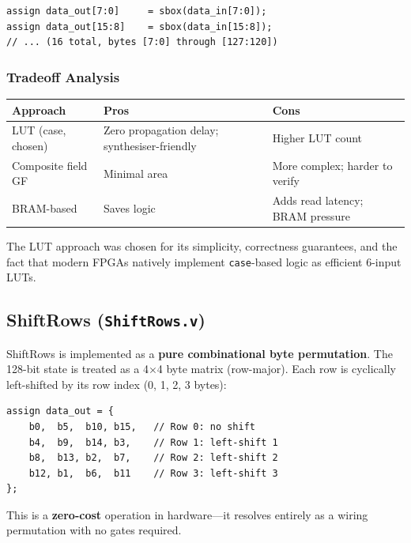 \documentclass[12pt,a4paper]{article}
\begin{document}
\begin{lstlisting}[caption={Parallel byte-wise S-box application}]
assign data_out[7:0]     = sbox(data_in[7:0]);
assign data_out[15:8]    = sbox(data_in[15:8]);
// ... (16 total, bytes [7:0] through [127:120])
\end{lstlisting}

\subsubsection{Tradeoff Analysis}

\begin{table}[H]
\centering
\begin{tabular}{@{}lll@{}}
\toprule
\textbf{Approach} & \textbf{Pros} & \textbf{Cons}\\
\midrule
LUT (case, chosen) & Zero propagation delay; synthesiser-friendly & Higher LUT count\\
Composite field GF & Minimal area & More complex; harder to verify\\
BRAM-based         & Saves logic & Adds read latency; BRAM pressure\\
\bottomrule
\end{tabular}
\end{table}

The LUT approach was chosen for its simplicity, correctness guarantees, and
the fact that modern FPGAs natively implement \texttt{case}-based logic as
efficient 6-input LUTs.

\subsection{ShiftRows (\texttt{ShiftRows.v})}

ShiftRows is implemented as a \textbf{pure combinational byte permutation}.
The 128-bit state is treated as a 4$\times$4 byte matrix (row-major). Each
row is cyclically left-shifted by its row index (0, 1, 2, 3 bytes):

\begin{lstlisting}[caption={ShiftRows byte permutation}]
assign data_out = {
    b0,  b5,  b10, b15,   // Row 0: no shift
    b4,  b9,  b14, b3,    // Row 1: left-shift 1
    b8,  b13, b2,  b7,    // Row 2: left-shift 2
    b12, b1,  b6,  b11    // Row 3: left-shift 3
};
\end{lstlisting}

This is a \textbf{zero-cost} operation in hardware---it resolves entirely
as a wiring permutation with no gates required.
\end{document}
